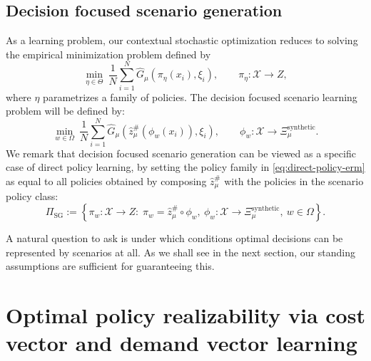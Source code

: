 \documentclass{article}
\newcommand{\1}{\mathbf{1}}
\theoremstyle{plain}
\theoremstyle{definition}
\theoremstyle{remark}
\begin{document}
\subsection{Decision focused scenario generation}
\label{sec:decision-focused-scenario-generation}

As a learning problem, our contextual stochastic optimization reduces to solving the empirical minimization problem defined by
\begin{equation}
\label{eq:direct-policy-erm}
\min_{\eta\in\Theta}\ \frac1N\sum_{i=1}^N \hat G_\mu(\pi_\eta(x_i),\xi_i),
\qquad
\pi_\eta:\mathcal X\to Z,
\end{equation}
where $\eta$ parametrizes a family of policies.
The decision focused scenario learning problem will be defined by:
\begin{equation}
\label{eq:scenario-generation-erm}
\min_{w\in\Omega}\ \frac1N\sum_{i=1}^N
\hat G_\mu\!\left(\hat z_\mu^\#(\phi_w(x_i)),\xi_i\right),
\qquad
\phi_w:\mathcal X\to \Xi_\mu^{\mathrm{synthetic}}.
\end{equation}
We remark that decision focused scenario generation can be viewed as a specific case of direct policy learning, by setting the policy family in \eqref{eq:direct-policy-erm} as equal to all policies obtained by composing $\hat z_\mu^{\#}$ with the policies in the scenario policy class:
\begin{equation}
\label{eq:scenario-policy-class}
\Pi_{\mathrm{SG}}:=
\left\{
\pi_w:\mathcal X\to Z:\;
\pi_w=\hat z_\mu^\#\circ \phi_w,\ \phi_w:\mathcal X\to \Xi_\mu^{\mathrm{synthetic}},\ w\in\Omega
\right\}.
\end{equation}

A natural question to ask is under which conditions optimal decisions can be represented by scenarios at all. As we shall see in the next section, our standing assumptions are sufficient for guaranteeing this.

\section{Optimal policy realizability via cost vector and demand vector learning}
\label{sec:optimal-policy-realizability}
\label{sec:realizability}
\end{document}
